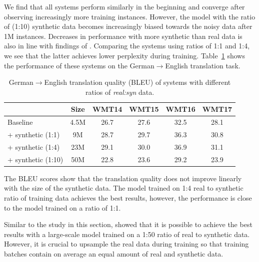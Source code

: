 We find that all systems perform similarly in the beginning and converge after observing increasingly more training instances.
However, the model with the ratio of (\mbox{1:10}) synthetic data becomes increasingly biased towards the noisy data after 1M instances.
Decreases in performance with more synthetic than real data is also in line with findings of \citet{2018arXiv180406189P}.
%
Comparing the systems using ratios of \mbox{1:1} and \mbox{1:4}, we see that the latter achieves lower perplexity during training.
Table~\ref{bigbigger} shows the performance of these systems on the German$\rightarrow$English translation task. 
%
\setlength{\tabcolsep}{4pt}
\begin{table}[htb!]
\begin{center}
\caption{\label{bigbigger} German$\rightarrow$English translation quality ({BLEU}) of systems with different ratios of \textit{\mbox{real:syn}} data.}
\begin{tabular}{lccccc}
 \toprule \bf  & \bf 	Size &  \bf WMT14 &  \bf	WMT15 &  \bf	WMT16 &  \bf	WMT17 \\ \midrule%
 Baseline	& 4.5M	& 26.7	&27.6	&32.5	&28.1\\
\hspace{.15cm} + synthetic (\mbox{1:1})	& 9M	&	28.7&	29.7	&36.3	&30.8\\
\hspace{.15cm} + synthetic (\mbox{1:4}) 	&23M	&	29.1&	30.0&	36.9	&31.1\\
\hspace{.15cm} + synthetic (\mbox{1:10})  & 50M	&22.8&23.6&	29.2	&		 23.9\\
\bottomrule
\end{tabular}
\end{center}
\end{table}
%
The {BLEU} scores show that the translation quality does not improve linearly with the size of the synthetic data.
The model trained on \mbox{1:4} real to synthetic ratio of training data achieves the best results, however, the performance is close to the model trained on a ratio of \mbox{1:1}.

Similar to the study in this section, \citet{edunov-etal-2018-understanding} showed that it is possible to achieve the best results with a large-scale model trained on a \mbox{1:50} ratio of real to synthetic data. 
However, it is crucial to upsample the real data during training so that training batches contain on average an equal amount of real and synthetic data.




